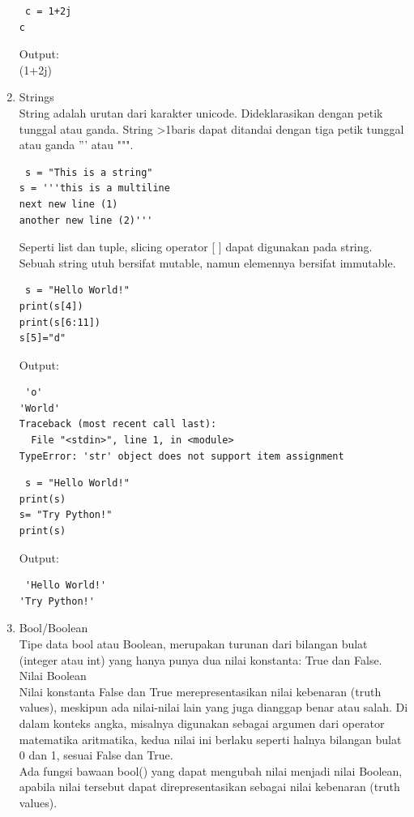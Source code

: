 \begin{enumerate}
 \begin{verbatim}
 c = 1+2j
c
 \end{verbatim}
 Output:\\
 (1+2j)
 \item Strings\\
 String adalah urutan dari karakter unicode. Dideklarasikan dengan petik tunggal atau ganda. String >1baris dapat ditandai dengan tiga petik tunggal atau ganda ''' atau """.
 \begin{verbatim}
 s = "This is a string"
s = '''this is a multiline
next new line (1)
another new line (2)'''
 \end{verbatim}
 Seperti list dan tuple, slicing operator [ ] dapat digunakan pada string. Sebuah string utuh bersifat mutable, namun elemennya bersifat immutable.
 \begin{verbatim}
 s = "Hello World!"
print(s[4])
print(s[6:11])
s[5]="d"
 \end{verbatim}
 Output:
 \begin{verbatim}
 'o'
'World'
Traceback (most recent call last):
  File "<stdin>", line 1, in <module>
TypeError: 'str' object does not support item assignment
 \end{verbatim}
 \begin{verbatim}
 s = "Hello World!"
print(s)
s= "Try Python!"
print(s)
 \end{verbatim}
 Output:
 \begin{verbatim}
 'Hello World!'
'Try Python!'
 \end{verbatim}
 
 \item Bool/Boolean\\
 Tipe data bool atau Boolean, merupakan turunan dari bilangan bulat (integer atau int) yang hanya punya dua nilai konstanta: True dan False.\\

Nilai Boolean\\
Nilai konstanta False dan True merepresentasikan nilai kebenaran (truth values), meskipun ada nilai-nilai lain yang juga dianggap benar atau salah. Di dalam konteks angka, misalnya digunakan sebagai argumen dari operator matematika aritmatika, kedua nilai ini berlaku seperti halnya bilangan bulat 0 dan 1, sesuai False dan True.\\

Ada fungsi bawaan bool() yang dapat mengubah nilai menjadi nilai Boolean, apabila nilai tersebut dapat direpresentasikan sebagai nilai kebenaran (truth values). \\


\end{enumerate}
